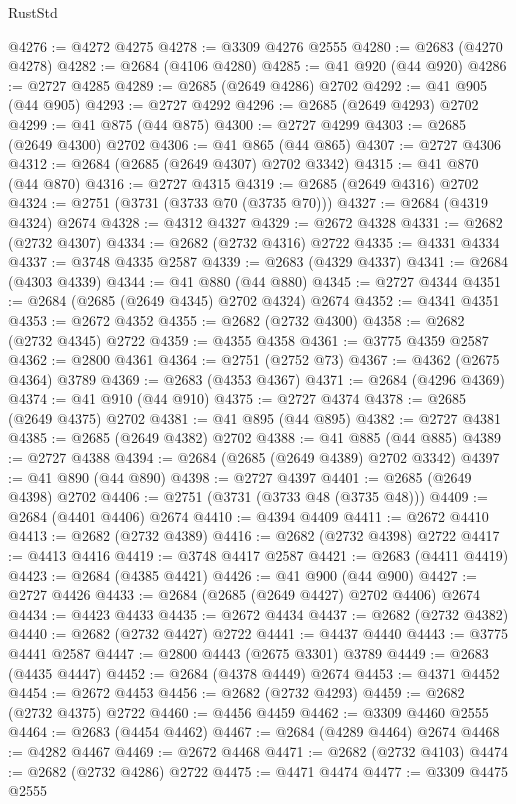 \begin{lexlean}{RustStd}
\begin{coremodule}
@4276 := @4272 @4275
@4278 := @3309 @4276 @2555
@4280 := @2683 (@4270 @4278)
@4282 := @2684 (@4106 @4280)
@4285 := @41 @920 (@44 @920)
@4286 := @2727 @4285
@4289 := @2685 (@2649 @4286) @2702
@4292 := @41 @905 (@44 @905)
@4293 := @2727 @4292
@4296 := @2685 (@2649 @4293) @2702
@4299 := @41 @875 (@44 @875)
@4300 := @2727 @4299
@4303 := @2685 (@2649 @4300) @2702
@4306 := @41 @865 (@44 @865)
@4307 := @2727 @4306
@4312 := @2684 (@2685 (@2649 @4307) @2702 @3342)
@4315 := @41 @870 (@44 @870)
@4316 := @2727 @4315
@4319 := @2685 (@2649 @4316) @2702
@4324 := @2751 (@3731 (@3733 @70 (@3735 @70)))
@4327 := @2684 (@4319 @4324) @2674
@4328 := @4312 @4327
@4329 := @2672 @4328
@4331 := @2682 (@2732 @4307)
@4334 := @2682 (@2732 @4316) @2722
@4335 := @4331 @4334
@4337 := @3748 @4335 @2587
@4339 := @2683 (@4329 @4337)
@4341 := @2684 (@4303 @4339)
@4344 := @41 @880 (@44 @880)
@4345 := @2727 @4344
@4351 := @2684 (@2685 (@2649 @4345) @2702 @4324) @2674
@4352 := @4341 @4351
@4353 := @2672 @4352
@4355 := @2682 (@2732 @4300)
@4358 := @2682 (@2732 @4345) @2722
@4359 := @4355 @4358
@4361 := @3775 @4359 @2587
@4362 := @2800 @4361
@4364 := @2751 (@2752 @73)
@4367 := @4362 (@2675 @4364) @3789
@4369 := @2683 (@4353 @4367)
@4371 := @2684 (@4296 @4369)
@4374 := @41 @910 (@44 @910)
@4375 := @2727 @4374
@4378 := @2685 (@2649 @4375) @2702
@4381 := @41 @895 (@44 @895)
@4382 := @2727 @4381
@4385 := @2685 (@2649 @4382) @2702
@4388 := @41 @885 (@44 @885)
@4389 := @2727 @4388
@4394 := @2684 (@2685 (@2649 @4389) @2702 @3342)
@4397 := @41 @890 (@44 @890)
@4398 := @2727 @4397
@4401 := @2685 (@2649 @4398) @2702
@4406 := @2751 (@3731 (@3733 @48 (@3735 @48)))
@4409 := @2684 (@4401 @4406) @2674
@4410 := @4394 @4409
@4411 := @2672 @4410
@4413 := @2682 (@2732 @4389)
@4416 := @2682 (@2732 @4398) @2722
@4417 := @4413 @4416
@4419 := @3748 @4417 @2587
@4421 := @2683 (@4411 @4419)
@4423 := @2684 (@4385 @4421)
@4426 := @41 @900 (@44 @900)
@4427 := @2727 @4426
@4433 := @2684 (@2685 (@2649 @4427) @2702 @4406) @2674
@4434 := @4423 @4433
@4435 := @2672 @4434
@4437 := @2682 (@2732 @4382)
@4440 := @2682 (@2732 @4427) @2722
@4441 := @4437 @4440
@4443 := @3775 @4441 @2587
@4447 := @2800 @4443 (@2675 @3301) @3789
@4449 := @2683 (@4435 @4447)
@4452 := @2684 (@4378 @4449) @2674
@4453 := @4371 @4452
@4454 := @2672 @4453
@4456 := @2682 (@2732 @4293)
@4459 := @2682 (@2732 @4375) @2722
@4460 := @4456 @4459
@4462 := @3309 @4460 @2555
@4464 := @2683 (@4454 @4462)
@4467 := @2684 (@4289 @4464) @2674
@4468 := @4282 @4467
@4469 := @2672 @4468
@4471 := @2682 (@2732 @4103)
@4474 := @2682 (@2732 @4286) @2722
@4475 := @4471 @4474
@4477 := @3309 @4475 @2555

\end{coremodule}
\end{lexlean}
